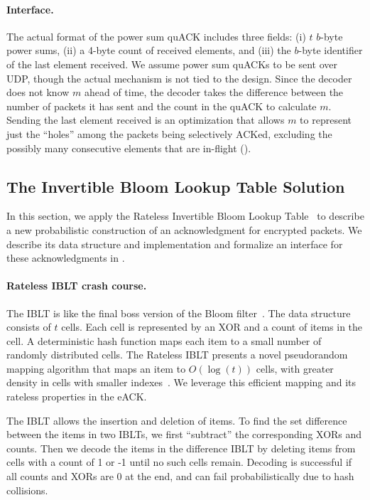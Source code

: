 \paragraph{Interface.}

The actual format of the power sum quACK includes three fields: (i) $t$ $b$-byte
power sums, (ii) a 4-byte count of received elements, and (iii) the $b$-byte
identifier of the last element received. We assume power sum quACKs to be sent
over UDP, though the actual mechanism is not tied to the design.
Since the decoder
does not know $m$ ahead of time, the decoder takes the difference between the
number of packets it has sent and the count in the quACK to calculate $m$.
Sending the last element received is an optimization that allows $m$ to
represent just the ``holes'' among the packets being selectively ACKed,
excluding the possibly many consecutive elements that are in-flight
().

\subsection{The Invertible Bloom Lookup Table Solution}


In this section, we apply
the Rateless Invertible Bloom Lookup Table~\cite{yang2024practical}
to describe a new probabilistic construction of an acknowledgment
for encrypted packets. We describe its data structure and implementation
and formalize an interface for these acknowledgments in .

\paragraph{Rateless IBLT crash course.} The IBLT is like the final boss version
 of the Bloom filter~\cite{goodrich2011invertible}. The data structure consists of $t$ cells. Each
 cell is represented by an XOR and a count of items in the cell. A
 deterministic hash function maps each item to a small number of randomly
 distributed cells. The Rateless IBLT presents a novel pseudorandom mapping
 algorithm that maps an item to $O(\log(t))$ cells, with greater density in
 cells with smaller indexes~\cite{yang2024practical}. We leverage this
 efficient mapping and its rateless properties in the eACK.

The IBLT allows the insertion and deletion of items. To find the set difference
between the items in two IBLTs, we first ``subtract'' the corresponding XORs
and counts. Then we decode the items in the difference IBLT by deleting items
from cells with a count of 1 or -1 until no such cells remain. Decoding is
successful if all counts and XORs are 0 at the end, and can fail
probabilistically due to hash collisions.

